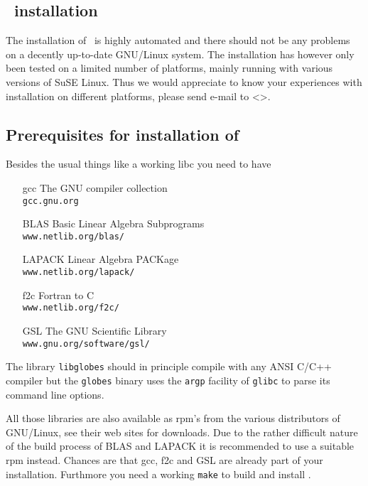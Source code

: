 
\begin{appendix}

\chapter{\GLOBES\ installation}
\label{app:installation}


The installation of \GLOBES\ is highly automated and there should not be
any problems on a decently up-to-date GNU/Linux system. The installation
has however only been tested on a limited number of platforms, mainly
running with various versions of SuSE Linux. Thus we would appreciate
to know your experiences with installation on different platforms, please
send e-mail to <\bugs>.

\section*{Prerequisites for installation of \GLOBES}

Besides the usual things like a working libc you need to have
\begin{itemize}
\item[gcc] The GNU compiler collection\\
\verb+gcc.gnu.org+
\item[BLAS] Basic Linear Algebra Subprograms\\
\verb+www.netlib.org/blas/+    
\item[LAPACK] Linear Algebra PACKage\\
\verb+www.netlib.org/lapack/+
\item[f2c] Fortran to C\\ 
\verb+www.netlib.org/f2c/+
\item[GSL] The GNU Scientific Library\\
\verb+www.gnu.org/software/gsl/+
\end{itemize}
The library \verb+libglobes+ should in principle compile with any
ANSI C/C++ compiler but the \verb+globes+ binary uses the 
\verb+argp+ facility of \verb+glibc+ to parse its command line options.

All those libraries are also available as rpm's from the various
distributors of GNU/Linux, see their web sites for downloads. Due to
the rather difficult nature of the build process of BLAS and LAPACK
it is recommended to use a suitable rpm instead. Chances are that
gcc, f2c and GSL are already part of your installation. Furthmore you need
a working \verb+make+ to build and install \GLOBES.


\end{appendix}
